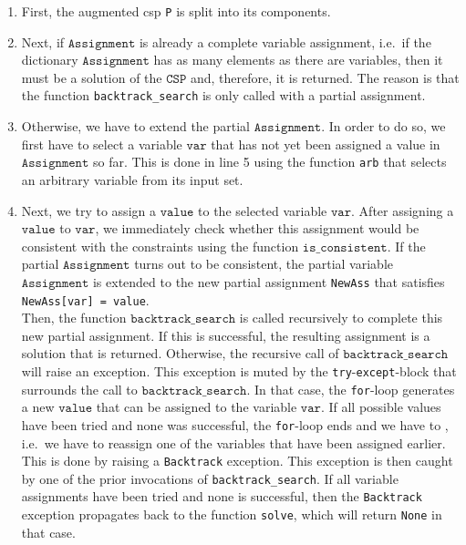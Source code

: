 \begin{enumerate}
\item First, the augmented \ac{csp} \texttt{P} is split into its components.
\item Next, if $\texttt{Assignment}$ is already a complete variable assignment, i.e.~if the dictionary
      $\texttt{Assignment}$ has as many elements as there are variables, then it must be a solution of
      the $\texttt{CSP}$ and, therefore, it is returned.  The reason is that the function
      \texttt{backtrack\_search} is only called with a  partial assignment.
\item Otherwise, we have to extend the partial $\texttt{Assignment}$.  In order to do so, we first have to
      select a variable $\texttt{var}$ that has not yet been assigned a value in $\texttt{Assignment}$ so far.
      This is done in line 5 using the function \texttt{arb} that selects an arbitrary variable
      from its input set.  
\item Next, we try to assign a $\texttt{value}$ to the selected variable $\texttt{var}$.  After assigning
      a $\texttt{value}$ to $\texttt{var}$, we immediately check whether this assignment would be consistent
      with the constraints using the function $\texttt{is\_consistent}$.
      If the partial $\texttt{Assignment}$ turns out to be consistent, the partial variable $\texttt{Assignment}$
      is extended to the new partial assignment \texttt{NewAss} that satisfies
      \\[0.2cm]
      \hspace*{1.3cm}
      \texttt{NewAss[var] = value}.
      \\[0.2cm]
      Then, the function $\texttt{backtrack\_search}$ is called recursively to complete this new partial assignment.
      If this is successful, the resulting assignment is a solution that is returned.  Otherwise,
      the recursive call of $\texttt{backtrack\_search}$ will raise an exception.  This exception is muted 
      by the \texttt{try}-\texttt{except}-block that surrounds the call to $\texttt{backtrack\_search}$.  In that case, the
      \texttt{for}-loop generates a new $\texttt{value}$ that can be assigned to the variable
      $\texttt{var}$.  If all possible values have been tried and none was successful, the \texttt{for}-loop
      ends and we have to , i.e.~we have to reassign one of the variables that have been
      assigned earlier.  This is done by raising a \texttt{Backtrack} exception.  This exception is then caught
      by one of the prior invocations of \texttt{backtrack\_search}.  If all variable assignments have been
      tried and none is successful, then the \texttt{Backtrack} exception propagates back to the function
      \texttt{solve}, which will return \texttt{None} in that case.
\end{enumerate}




